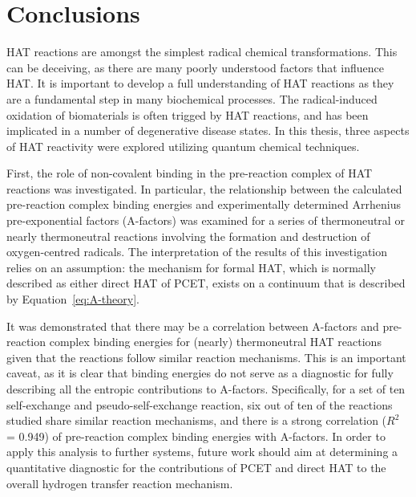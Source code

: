 
\chapter{Conclusions}

\begin{doublespace}

HAT reactions are amongst the simplest radical chemical transformations. This
can be deceiving, as there are many poorly understood factors that influence
HAT. It is important to develop a full understanding of HAT reactions as they
are a fundamental step in many biochemical processes. The radical-induced
oxidation of biomaterials is often trigged by HAT reactions, and has been
implicated in a number of degenerative disease states. In this thesis, three
aspects of HAT reactivity were explored utilizing quantum chemical techniques.

First, the role of non-covalent binding in the pre-reaction complex of HAT
reactions was investigated. In particular, the relationship between the
calculated pre-reaction complex binding energies and experimentally determined
Arrhenius pre-exponential factors (A-factors) was examined for a series of
thermoneutral or nearly thermoneutral reactions involving the formation and
destruction of oxygen-centred radicals. The interpretation of the results of
this investigation relies on an assumption: the mechanism for formal HAT, which
is normally described as either direct HAT of PCET, exists on a continuum that
is described by Equation~\ref{eq:A-theory}.

It was demonstrated that there may be a correlation between A-factors and
pre-reaction complex binding energies for (nearly) thermoneutral HAT reactions
given that the reactions follow similar reaction mechanisms. This is an
important caveat, as it is clear that binding energies do not serve as a
diagnostic for fully describing all the entropic contributions to A-factors.
Specifically, for a set of ten self-exchange and pseudo-self-exchange reaction,
six out of ten of the reactions studied share similar reaction mechanisms, and
there is a strong correlation ($R^2$ = 0.949) of pre-reaction complex binding
energies with A-factors. In order to apply this analysis to further systems,
future work should aim at determining a quantitative diagnostic for the
contributions of PCET and direct HAT to the overall hydrogen transfer reaction
mechanism.


\end{doublespace}
